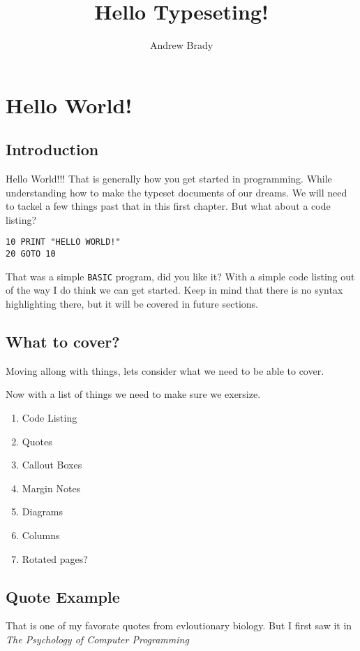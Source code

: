 \documentclass[12pt,A5]{report}
\author{Andrew Brady}
\title{Hello Typeseting!}
\begin{document}
\maketitle
\tableofcontents


\chapter{Hello World!}

\section{Introduction}
Hello World!!! That is generally how you get started in programming. While understanding how to make the typeset documents of our dreams. We will need to tackel a few things past that in this first chapter. \newline But what about a code listing?

\begin{verbatim}
10 PRINT "HELLO WORLD!"
20 GOTO 10
\end{verbatim}

That was a simple \verb|BASIC| program, did you like it? With a simple code listing out of the way I do think we can get started. Keep in mind that there is no syntax highlighting there, but it will be covered in future sections.

\section{What to cover?}
Moving allong with things, lets consider what we need to be able to cover. 

Now with a list of things we need to make sure we exersize.

\begin{multicols*}{3}

\begin{enumerate}
\item Code Listing
\item Quotes
\item Callout Boxes
\item Margin Notes
\item Diagrams
\item Columns
\item Rotated pages?
\end{enumerate}
\end{multicols*}

\section{Quote Example}
That is one of my favorate quotes from evloutionary biology. But I first saw it in \textit{The Psychology of Computer Programming}
\end{document}
